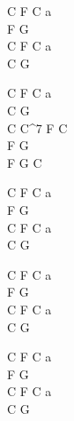 \begin{chord}
    C F C a\\
    F G\\
    C F C a\\
    C G
	
    C F C a\\
    C G \\
    C C^7 F C\\
    F G \\
    F G C 
    
    C F C a\\
    F G\\
    C F C a\\
    C G\\
    \hfill\break
    
    C F C a\\
    F G\\
    C F C a\\
    C G\\
    \hfill\break
    
    C F C a\\
    F G\\
    C F C a\\
    C G\\
    \hfill\break
\end{chord}
